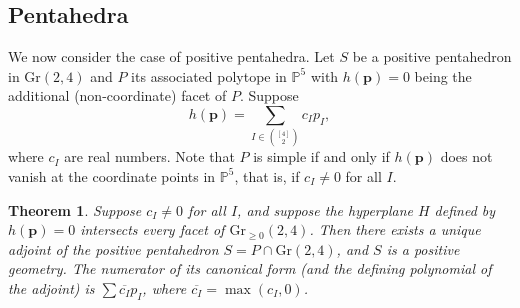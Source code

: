 \documentclass[12pt]{extarticle}
\newtheorem{theorem}{Theorem}[section]
\theoremstyle{definition}
\begin{document}
\subsection{Pentahedra}
We now consider the case of positive pentahedra. Let $S$ be a positive pentahedron in $\mathrm{Gr}(2,4)$ and $P$ its associated polytope in $\mathbb{P}^5$ with $h(\mathbf{p}) = 0$ being the additional (non-coordinate) facet of $P$. Suppose 
$$h(\mathbf{p}) = \sum\limits_{I \in \binom{[4]}{2}} c_Ip_I,$$
where $c_I$ are real numbers. Note that $P$ is simple if and only if $h(\mathbf{p})$ does not vanish at the coordinate points in $\mathbb{P}^5$, that is, if $c_I\neq 0$ for all $I$.

\begin{theorem} \label{thm:penta}
    Suppose $c_I\neq 0$ for all $I$, and suppose the hyperplane $H$ defined by $h(\mathbf{p}) = 0$ intersects every facet of $\mathrm{Gr}_{\geq 0}(2,4)$. Then there exists a unique adjoint of the positive pentahedron $S = P \cap \mathrm{Gr}(2,4)$, and $S$ is a positive geometry. The numerator of its canonical form (and the defining polynomial of the adjoint) is $\sum \overline{c_I}p_I$, where $\overline{c_I} = \max (c_I, 0)$.
\end{theorem}
\end{document}
